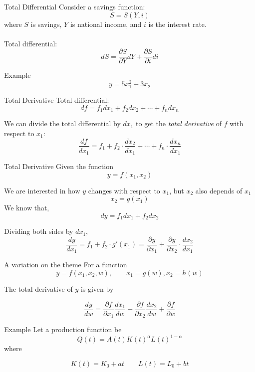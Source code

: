 \documentclass{./../../Latex/teaching_slides}
\begin{document}
\begin{frame}{Total Differential}
Consider a savings function:
\[
S=S(Y, i)
\]
where $S$ is savings, $Y$ is national income, and $i$ is the interest rate. \\~\\
Total differential:
\[ 
d S=\frac{\partial S}{\partial Y} d Y+\frac{\partial S}{\partial i} d i
\]
\end{frame}

\begin{frame}{Example}
$$ y = 5 x_1^2 + 3x_2 $$
\end{frame}


\begin{frame}{Total Derivative}
Total differential:
\[
d f= f_1 d x_{1}+ f_2 d x_{2}+\cdots+f_n d x_{n}
\] \vspace{0.25em}

We can divide the total differential by $dx_1$ to get the \textit{total derivative} of $f$ with respect to $x_1$:
\[
\frac{d f}{dx_1} = f_1 + f_2 \cdot \frac{d x_{2}}{d x_{1}}+\cdots+f_n \cdot\frac{d x_{n}}{d x_{1}}
\]
\end{frame}

\begin{frame}{Total Derivative}
Given the function 
\[ y = f(x_1, x_2) \]

We are interested in how $y$ changes with respect to $x_1$, but $x_2$ also depends of $x_1$
\[ x_2 = g(x_1) \]
We know that, 
\[ dy = f_1 dx_1 + f_2dx_2 \]

Dividing both sides by $dx_1$, 
\[ \frac{dy}{dx_1} =  f_1+f_2 \cdot g'(x_1) = \frac{\partial y}{\partial x_1} + \frac{\partial y}{\partial x_2} \cdot \frac{d x_2}{dx_1}  \]
\end{frame}

\begin{frame}{A variation on the theme}
For a function
$$
y=f\left(x_{1}, x_{2}, w\right), \quad \quad x_{1}=g(w), x_{2}=h(w)
$$

\vspace{1cm}
The total derivative of $y$ is given by

$$
\frac{d y}{d w}=\frac{\partial f}{\partial x_{1}} \frac{d x_{1}}{d w}+\frac{\partial f}{\partial x_{2}} \frac{d x_{2}}{d w}+\frac{\partial f}{\partial w} 
$$
\end{frame}

\begin{frame}{Example}
Let a production function be
$$
Q(t) = A(t) K(t)^{\alpha} L(t)^{1-\alpha} 
$$
where 

$$
K(t) = K_0 + at  \quad \quad L(t) = L_0 + bt
$$
\end{frame}
\end{document}
